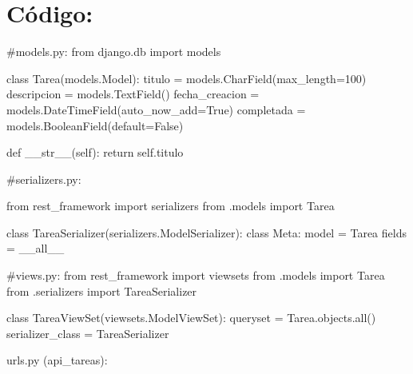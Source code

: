 \documentclass[
  a4paper,
  DIV=11,
  numbers=noendperiod,
  onepage,
  openany]{scrreprt}
\newenvironment{Shaded}{\begin{snugshade}}{\end{snugshade}}
\newcommand{\BuiltInTok}[1]{\textcolor[rgb]{0.00,0.23,0.31}{#1}}
\newcommand{\CommentTok}[1]{\textcolor[rgb]{0.37,0.37,0.37}{#1}}
\newcommand{\ControlFlowTok}[1]{\textcolor[rgb]{0.00,0.23,0.31}{#1}}
\newcommand{\DecValTok}[1]{\textcolor[rgb]{0.68,0.00,0.00}{#1}}
\newcommand{\FunctionTok}[1]{\textcolor[rgb]{0.28,0.35,0.67}{#1}}
\newcommand{\ImportTok}[1]{\textcolor[rgb]{0.00,0.46,0.62}{#1}}
\newcommand{\KeywordTok}[1]{\textcolor[rgb]{0.00,0.23,0.31}{#1}}
\newcommand{\NormalTok}[1]{\textcolor[rgb]{0.00,0.23,0.31}{#1}}
\newcommand{\OperatorTok}[1]{\textcolor[rgb]{0.37,0.37,0.37}{#1}}
\newcommand{\StringTok}[1]{\textcolor[rgb]{0.13,0.47,0.30}{#1}}
\newcommand{\VariableTok}[1]{\textcolor[rgb]{0.07,0.07,0.07}{#1}}
\begin{document}
\section{Código:}\label{cuxf3digo}

\begin{Shaded}
\begin{Highlighting}[]
\CommentTok{\#models.py:}
\ImportTok{from}\NormalTok{ django.db }\ImportTok{import}\NormalTok{ models}

\KeywordTok{class}\NormalTok{ Tarea(models.Model):}
\NormalTok{    titulo }\OperatorTok{=}\NormalTok{ models.CharField(max\_length}\OperatorTok{=}\DecValTok{100}\NormalTok{)}
\NormalTok{    descripcion }\OperatorTok{=}\NormalTok{ models.TextField()}
\NormalTok{    fecha\_creacion }\OperatorTok{=}\NormalTok{ models.DateTimeField(auto\_now\_add}\OperatorTok{=}\VariableTok{True}\NormalTok{)}
\NormalTok{    completada }\OperatorTok{=}\NormalTok{ models.BooleanField(default}\OperatorTok{=}\VariableTok{False}\NormalTok{)}

    \KeywordTok{def} \FunctionTok{\_\_str\_\_}\NormalTok{(}\VariableTok{self}\NormalTok{):}
        \ControlFlowTok{return} \VariableTok{self}\NormalTok{.titulo}
\end{Highlighting}
\end{Shaded}

\begin{Shaded}
\begin{Highlighting}[]
\CommentTok{\#serializers.py:}

\ImportTok{from}\NormalTok{ rest\_framework }\ImportTok{import}\NormalTok{ serializers}
\ImportTok{from}\NormalTok{ .models }\ImportTok{import}\NormalTok{ Tarea}

\KeywordTok{class}\NormalTok{ TareaSerializer(serializers.ModelSerializer):}
    \KeywordTok{class}\NormalTok{ Meta:}
\NormalTok{        model }\OperatorTok{=}\NormalTok{ Tarea}
\NormalTok{        fields }\OperatorTok{=} \StringTok{\textquotesingle{}\_\_all\_\_\textquotesingle{}}
\end{Highlighting}
\end{Shaded}

\begin{Shaded}
\begin{Highlighting}[]
\CommentTok{\#views.py:}
\ImportTok{from}\NormalTok{ rest\_framework }\ImportTok{import}\NormalTok{ viewsets}
\ImportTok{from}\NormalTok{ .models }\ImportTok{import}\NormalTok{ Tarea}
\ImportTok{from}\NormalTok{ .serializers }\ImportTok{import}\NormalTok{ TareaSerializer}

\KeywordTok{class}\NormalTok{ TareaViewSet(viewsets.ModelViewSet):}
\NormalTok{    queryset }\OperatorTok{=}\NormalTok{ Tarea.objects.}\BuiltInTok{all}\NormalTok{()}
\NormalTok{    serializer\_class }\OperatorTok{=}\NormalTok{ TareaSerializer}

\NormalTok{    urls.py (api\_tareas):}
\end{Highlighting}
\end{Shaded}
\end{document}
